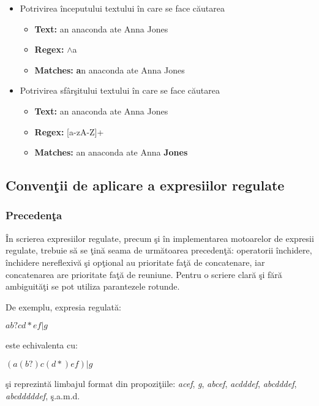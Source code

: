 \begin{itemize}
\item{Potrivirea începutului textului în care se face căutarea}
\begin{itemize}
\item \textbf{Text:} an anaconda ate Anna Jones
\item \textbf{Regex:} $\wedge$a
\item \textbf{Matches:} \textbf{a}n anaconda ate Anna Jones
\end{itemize}

\item{Potrivirea sfârşitului textului în care se face căutarea}
\begin{itemize}
\item \textbf{Text:} an anaconda ate Anna Jones
\item \textbf{Regex:} [a-zA-Z]+\textdollar
\item \textbf{Matches:} an anaconda ate Anna \textbf{Jones}
\end{itemize}
\end{itemize}

\subsection{Convenţii de aplicare a expresiilor regulate}

\subsubsection{Precedenţa}

În scrierea expresiilor regulate, precum şi în implementarea motoarelor de expresii regulate, trebuie să se ţină seama de următoarea precedenţă: operatorii închidere, închidere nereflexivă şi opţional au prioritate faţă de concatenare, iar concatenarea are prioritate faţă de reuniune. Pentru o scriere clară şi fără ambiguităţi se pot utiliza parantezele rotunde.

De exemplu, expresia regulată:

\begin{center}
$ab?cd*ef|g$ 
\end{center}

este echivalenta cu:

\begin{center}
$(a(b?)c(d*)ef)|g$
\end{center}

şi reprezintă limbajul format din propoziţiile: \textit{acef}, \textit{g}, \textit{abcef}, \textit{acdddef}, \textit{abcdddef}, \textit{abcdddddef}, ş.a.m.d.

